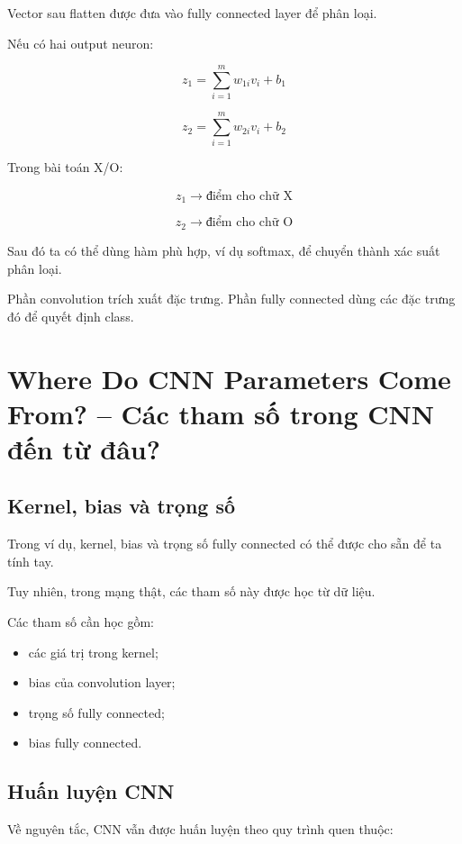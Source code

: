 Vector sau flatten được đưa vào fully connected layer để phân loại.

Nếu có hai output neuron:

\[
    z_1 =
    \sum_{i=1}^{m} w_{1i}v_i+b_1
\]

\[
    z_2 =
    \sum_{i=1}^{m} w_{2i}v_i+b_2
\]

Trong bài toán X/O:

\[
    z_1
    \rightarrow
    \text{điểm cho chữ X}
\]

\[
    z_2
    \rightarrow
    \text{điểm cho chữ O}
\]

Sau đó ta có thể dùng hàm phù hợp, ví dụ softmax, để chuyển thành xác suất phân loại.

\begin{ghinho}
Phần convolution trích xuất đặc trưng. Phần fully connected dùng các đặc trưng đó để quyết định class.
\end{ghinho}

\section{Where Do CNN Parameters Come From? -- Các tham số trong CNN đến từ đâu?}

\subsection{Kernel, bias và trọng số}

Trong ví dụ, kernel, bias và trọng số fully connected có thể được cho sẵn để ta tính tay.

Tuy nhiên, trong mạng thật, các tham số này được học từ dữ liệu.

Các tham số cần học gồm:

\begin{itemize}
    \item các giá trị trong kernel;
    \item bias của convolution layer;
    \item trọng số fully connected;
    \item bias fully connected.
\end{itemize}

\subsection{Huấn luyện CNN}

Về nguyên tắc, CNN vẫn được huấn luyện theo quy trình quen thuộc:

